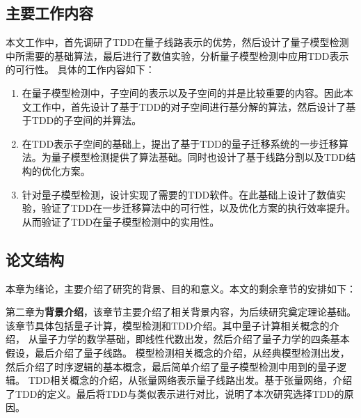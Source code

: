 \subsection*{主要工作内容}
本文工作中，首先调研了TDD在量子线路表示的优势，然后设计了量子模型检测中所需要的基础算法，最后进行了数值实验，分析量子模型检测中应用TDD表示的可行性。
具体的工作内容如下：
\begin{enumerate}
    \item 在量子模型检测中，子空间的表示以及子空间的并是比较重要的内容。因此本文工作中，首先设计了基于TDD的对子空间进行基分解的算法，然后设计了基于TDD的子空间的并算法。
    \item 
    在TDD表示子空间的基础上，提出了基于TDD的量子迁移系统的一步迁移算法。为量子模型检测提供了算法基础。同时也设计了基于线路分割以及TDD结构的优化方案。
    \item 针对量子模型检测，设计实现了需要的TDD软件。在此基础上设计了数值实验，验证了TDD在一步迁移算法中的可行性，以及优化方案的执行效率提升。从而验证了TDD在量子模型检测中的实用性。
\end{enumerate}

\subsection*{论文结构}
本章为绪论，主要介绍了研究的背景、目的和意义。本文的剩余章节的安排如下：

第二章为\textbf{背景介绍}，该章节主要介绍了相关背景内容，为后续研究奠定理论基础。该章节具体包括量子计算，模型检测和TDD介绍。其中量子计算相关概念的介绍，
从量子力学的数学基础，即线性代数出发，然后介绍了量子力学的四条基本假设，最后介绍了量子线路。
模型检测相关概念的介绍，从经典模型检测出发，然后介绍了时序逻辑的基本概念，最后简单介绍了量子模型检测中用到的量子逻辑。
TDD相关概念的介绍，从张量网络表示量子线路出发。基于张量网络，介绍了TDD的定义。最后将TDD与类似表示进行对比，说明了本次研究选择TDD的原因。

